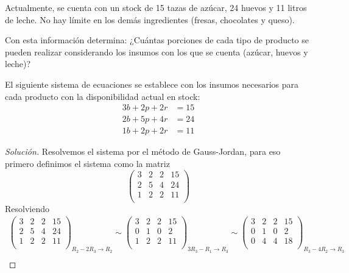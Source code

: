 \documentclass[12pt]{article}
\newenvironment{solution}{\begin{proof}[Solución]}{\end{proof}}
\begin{document}
\begin{enumerate}
    Actualmente, se cuenta con un stock de 15 tazas de azúcar, 24 huevos y 11 litros de leche. No hay límite en los demás ingredientes (fresas, chocolates y queso).

    Con esta información determina: ¿Cuántas porciones de cada tipo de producto se pueden realizar considerando los insumos con los que se cuenta (azúcar, huevos y leche)?

    El siguiente sistema de ecuaciones se establece con los insumos necesarios para cada producto con la disponibilidad actual en stock:
    \begin{align*}
        3b + 2p +2r &= 15 \\
        2b + 5p + 4r &= 24 \\
        1b + 2p +2r &= 11
    \end{align*}
    \begin{solution}
        Resolvemos el sistema por el método de Gauss-Jordan, para eso primero definimos el sistema como la matriz \[\left(\begin{array}{ccc|c}  
            3 & 2 & 2 & 15 \\  
            2 & 5 & 4 & 24  \\
            1 & 2 & 2 & 11 \\ 
        \end{array}\right)\]
        Resolviendo \begin{gather*}
            \left(\begin{array}{ccc|c}  
                3 & 2 & 2 & 15 \\  
                2 & 5 & 4 & 24  \\
                1 & 2 & 2 & 11 \\ 
            \end{array}\right)_{R_2-2R_3 \rightarrow R_2} \sim \left(\begin{array}{ccc|c}  
                3 & 2 & 2 & 15 \\  
                0 & 1 & 0 & 2  \\
                1 & 2 & 2 & 11 \\ 
            \end{array}\right)_{3R_3-R_1 \rightarrow R_3} \sim \left(\begin{array}{ccc|c}  
                3 & 2 & 2 & 15 \\  
                0 & 1 & 0 & 2  \\
                0 & 4 & 4 & 18 \\ 
            \end{array}\right)_{R_3-4R_2 \rightarrow R_3} \\

\end{gather*}
\end{solution}
\end{enumerate}
\end{document}
